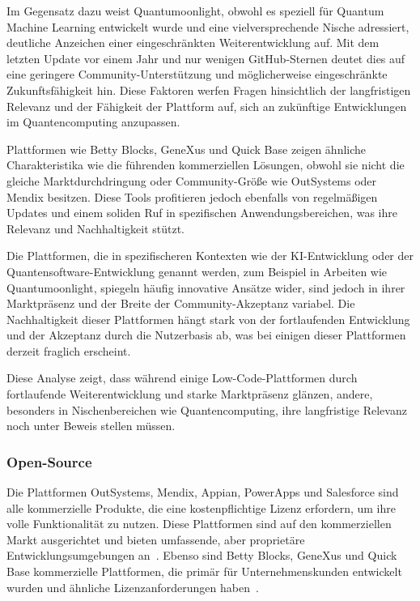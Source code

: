 Im Gegensatz dazu weist Quantumoonlight, obwohl es speziell für Quantum Machine Learning entwickelt wurde und eine vielversprechende 
Nische adressiert, deutliche Anzeichen einer eingeschränkten Weiterentwicklung auf. Mit dem letzten Update vor einem Jahr und 
nur wenigen GitHub-Sternen deutet dies auf eine geringere Community-Unterstützung und möglicherweise eingeschränkte Zukunftsfähigkeit 
hin. Diese Faktoren werfen Fragen hinsichtlich der langfristigen Relevanz und der Fähigkeit der Plattform auf, sich an zukünftige 
Entwicklungen im Quantencomputing anzupassen.

Plattformen wie Betty Blocks, GeneXus und Quick Base zeigen ähnliche Charakteristika wie die führenden kommerziellen Lösungen, obwohl 
sie nicht die gleiche Marktdurchdringung oder Community-Größe wie OutSystems oder Mendix besitzen. Diese Tools profitieren jedoch ebenfalls 
von regelmäßigen Updates und einem soliden Ruf in spezifischen Anwendungsbereichen, was ihre Relevanz und Nachhaltigkeit stützt.

Die Plattformen, die in spezifischeren Kontexten wie der KI-Entwicklung oder der Quantensoftware-Entwicklung genannt werden, zum 
Beispiel in Arbeiten wie Quantumoonlight, spiegeln häufig innovative Ansätze wider, sind jedoch in ihrer Marktpräsenz und der 
Breite der Community-Akzeptanz variabel. Die Nachhaltigkeit dieser Plattformen hängt stark von der fortlaufenden Entwicklung und 
der Akzeptanz durch die Nutzerbasis ab, was bei einigen dieser Plattformen derzeit fraglich erscheint. 

Diese Analyse zeigt, dass während einige Low-Code-Plattformen durch fortlaufende Weiterentwicklung und starke Marktpräsenz glänzen, 
andere, besonders in Nischenbereichen wie Quantencomputing, ihre langfristige Relevanz noch unter Beweis stellen müssen.


\subsubsection{Open-Source}
Die Plattformen OutSystems, Mendix, Appian, PowerApps und Salesforce sind alle kommerzielle Produkte, die eine kostenpflichtige 
Lizenz erfordern, um ihre volle Funktionalität zu nutzen. Diese Plattformen sind auf den kommerziellen Markt ausgerichtet und 
bieten umfassende, aber proprietäre Entwicklungsumgebungen an~\cite{Sahay_2020}. Ebenso sind Betty Blocks, GeneXus und Quick Base 
kommerzielle Plattformen, die primär für Unternehmenskunden entwickelt wurden und ähnliche Lizenzanforderungen haben~\cite{Bock_2021_essence}.

